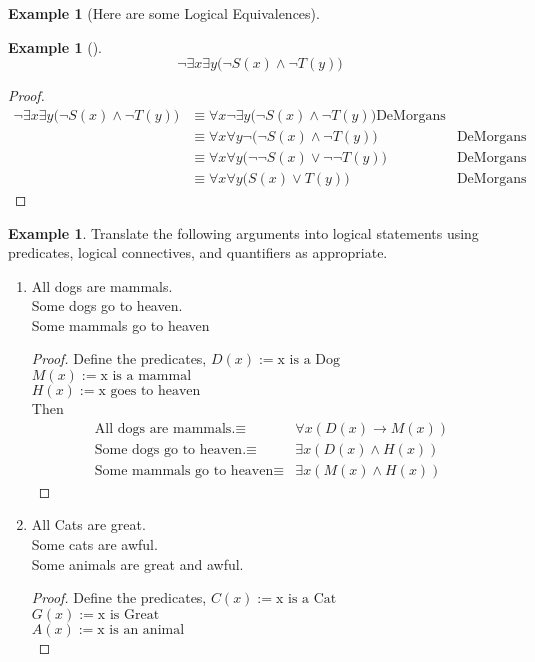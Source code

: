 \documentclass[letterpaper,10pt]{article}
\theoremstyle{plain}
\theoremstyle{definition}
\newtheorem{exmp}[thm]{Example}
\theoremstyle{remark}
\providecommand{\land}{\ensuremath{\wedge}}
\providecommand{\lor}{\ensuremath{\vee}}
\begin{document}
\begin{exmp}[Here are some Logical Equivalences]
\begin{exmp}[]
    \[\lnot \exists x \exists y \bigl( \lnot S(x) \land \lnot T(y) \bigr)\]
    \vspace{3cm}
\begin{proof}
 \begin{align}
\lnot \exists x \exists y \bigl( \lnot S(x) \land \lnot T(y) \bigr)&\equiv \forall x \lnot \exists y \bigl( \lnot S(x) \land \lnot T(y) \bigr)\text{DeMorgans}\\
&\equiv \forall x \forall y \lnot  \bigl( \lnot S(x) \land \lnot T(y) \bigr)&\text{DeMorgans}\\
&\equiv \forall x \forall y  \bigl( \lnot \lnot S(x) \lor \lnot \lnot T(y) \bigr)&\text{DeMorgans}\\
&\equiv \forall x \forall y  \bigl( S(x) \lor T(y) \bigr)&\text{DeMorgans}
 \end{align}
\end{proof}
\end{exmp}

\begin{exmp}
Translate the following arguments into logical statements using predicates, logical connectives, and quantifiers as appropriate.

  \begin{enumerate}
      \item
    All dogs are mammals.\\
    Some dogs go to heaven.\\
    Some mammals go to heaven
\vspace{3cm}
\begin{proof}
Define the predicates,
$D(x):=\text{x is a Dog}$\\
$M(x):=\text{x is a mammal}$\\
$H(x):=\text{x goes to heaven}$\\
Then
\begin{align}
\text{All dogs are mammals.}\equiv& \forall x (D(x)\to M(x))\\
\text{Some dogs go to heaven.}\equiv& \exists x (D(x)\land H(x))\\
\text{Some mammals go to heaven}\equiv& \exists x(M(x) \land H(x))
\end{align}


\end{proof}

  \item
    All Cats are great.\\
    Some cats are awful.\\
    Some animals are great and awful.
    \vspace{3cm}
    \begin{proof}
Define the predicates,
$C(x):=\text{x is a Cat}$\\
$G(x):=\text{x is Great}$\\
$A(x):=\text{x is an animal}$\\


\end{proof}
\end{enumerate}
\end{exmp}
\end{exmp}
\end{document}

